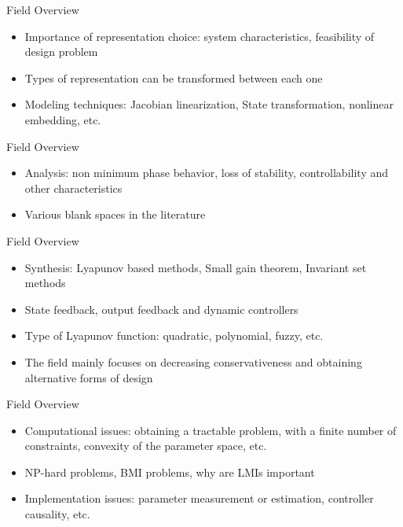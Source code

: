 \begin{frame}{Field Overview}
\begin{itemize}
        \item Importance of representation choice: system characteristics, feasibility of design problem
        
        \item Types of representation can be transformed between each one
        
        \item Modeling techniques: Jacobian linearization, State transformation, nonlinear embedding, etc. 

\end{itemize}
\end{frame}

\begin{frame}{Field Overview}
    \begin{itemize}
        \item Analysis: non minimum phase behavior, loss of stability, controllability and other characteristics
        
        \item Various blank spaces in the literature
    \end{itemize}
\end{frame}

\begin{frame}{Field Overview}
    \begin{itemize}
        \item Synthesis: Lyapunov based methods, Small gain theorem, Invariant set methods
        
        \item State feedback, output feedback and dynamic controllers
        
        \item Type of Lyapunov function: quadratic, polynomial, fuzzy, etc.
        
    \item The field mainly focuses on decreasing conservativeness and obtaining alternative forms of design
    \end{itemize}
\end{frame}

\begin{frame}{Field Overview}
    \begin{itemize}
        \item Computational issues: obtaining a tractable problem, with a finite number of constraints, convexity of the parameter space, etc.
        
        \item NP-hard problems, BMI problems, why are LMIs important
        
        \item Implementation issues: parameter measurement or estimation, controller causality, etc.
    \end{itemize}
\end{frame}
